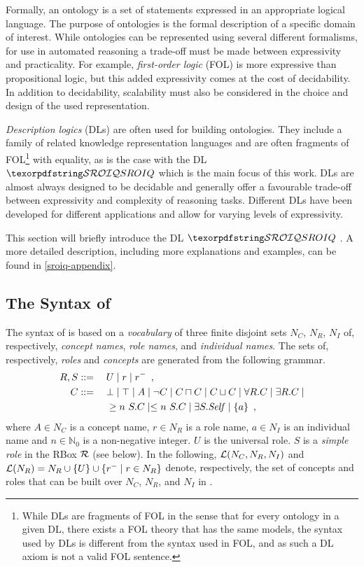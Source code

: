 Formally, an ontology is a set of statements expressed in an appropriate logical language. The purpose of ontologies is the formal description of a specific domain of interest. While ontologies can be represented using several different formalisms, for use in automated reasoning a trade-off must be made between expressivity and practicality. For example, \emph{first-order logic} (FOL) is more expressive than propositional logic, but this added expressivity comes at the cost of decidability. In addition to decidability, scalability must also be considered in the choice and design of the used representation.

\emph{Description logics} (DLs) are often used for building ontologies. They include a family of related knowledge representation languages and are often fragments of FOL\footnote{While DLs are fragments of FOL in the sense that for every ontology in a given DL, there exists a FOL theory that has the same models, the syntax used by DLs is different from the syntax used in FOL, and as such a DL axiom is not a valid FOL sentence.} with equality, as is the case with the DL $\SROIQ$ which is the main focus of this work. DLs are almost always designed to be decidable and generally offer a favourable trade-off between expressivity and complexity of reasoning tasks. Different DLs have been developed for different applications and allow for varying levels of expressivity.

This section will briefly introduce the DL $\SROIQ$ \cite{horrocks2006even,rudolph2011foundations,baader_horrocks_lutz_sattler_2017}. A more detailed description, including more explanations and examples, can be found in \cref{sroiq-appendix}.

\subsection{The Syntax of \SROIQ} \label{sroiq-syntax}

The syntax of \SROIQ is based on a \emph{vocabulary} of three finite disjoint sets $N_C$, $N_R$, $N_I$ of, respectively, \emph{concept names}, \emph{role names}, and \emph{individual names}. The sets of, respectively, \SROIQ  \emph{roles} and \SROIQ \emph{concepts} are generated from the following grammar.
\begin{alignat*}{2}
  R, S &::={} && U \mid r \mid r^{-} \enspace,\\
  C &::= && \bot \mid \top \mid A \mid \neg C \mid C \sqcap C \mid C \sqcup C \mid \forall R.C \mid \exists R.C \mid \\ 
  &&& \geq n~S.C \mid \leq n~S.C \mid \exists S.\mathit{Self} \mid \{a\} \enspace,
\end{alignat*}
where $A \in N_C$ is a concept name, $r \in N_R$ is a role name, $a \in N_I$ is an individual name and $n \in \mathbb{N}_0$ is a non-negative integer. 
%
$U$ is the universal role. $S$ is a \emph{simple role} in the RBox $\mathcal{R}$ (see below). In the following, $\mathcal{L}(N_C, N_R, N_I)$ and $\mathcal{L}(N_R) = N_R \cup \{U\} \cup \{r^- \mid r \in N_R\}$ denote, respectively, the set of concepts and roles that can be built over $N_C$, $N_R$, and $N_I$ in \SROIQ.


